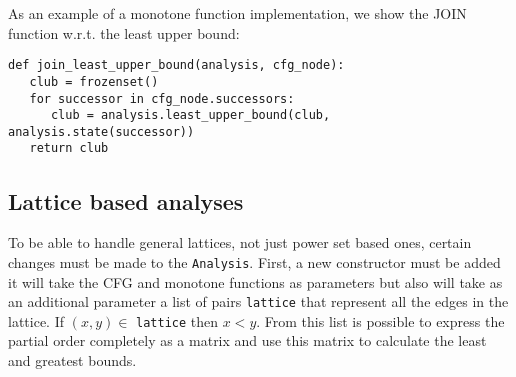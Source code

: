 As an example of a monotone function implementation, we show the JOIN function w.r.t. the least upper bound: 
\begin{verbatim}
def join_least_upper_bound(analysis, cfg_node):
   club = frozenset()
   for successor in cfg_node.successors:
      club = analysis.least_upper_bound(club, analysis.state(successor))
   return club
\end{verbatim}

\subsection{Lattice based analyses}
To be able to handle general lattices, not just power set based ones, certain changes must be made to the \lstinline{Analysis}. First, a new constructor must be added it will take the CFG and monotone functions as parameters but also will take as an additional parameter a list of pairs \lstinline{lattice} that represent all the edges in the lattice. If $(x,y) \in$ \lstinline{lattice} then $x < y$. From this list is possible to express the partial order completely as a matrix and use this matrix to calculate the least and greatest bounds. 


